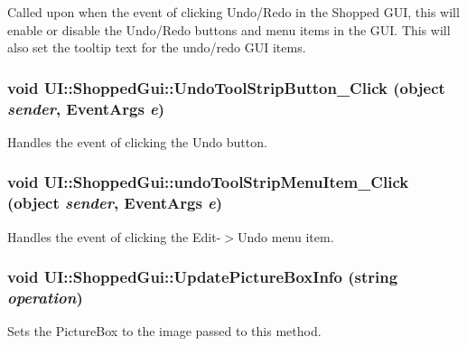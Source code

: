 \label{class_u_i_1_1_shopped_gui_a99e47a8b843bf190a7a0e3f8b3f5abb9}
Called upon when the event of clicking Undo/Redo in the Shopped GUI, this will enable or disable the Undo/Redo buttons and menu items in the GUI. This will also set the tooltip text for the undo/redo GUI items. \hypertarget{class_u_i_1_1_shopped_gui_a78f013b1629cf758caec6e07e8694988}{
\subsubsection[{UndoToolStripButton\_\-Click}]{\setlength{\rightskip}{0pt plus 5cm}void UI::ShoppedGui::UndoToolStripButton\_\-Click (object {\em sender}, \/  EventArgs {\em e})}}
\label{class_u_i_1_1_shopped_gui_a78f013b1629cf758caec6e07e8694988}
Handles the event of clicking the Undo button. \hypertarget{class_u_i_1_1_shopped_gui_a167624483eae61dcbe7de755ad0549a5}{
\subsubsection[{undoToolStripMenuItem\_\-Click}]{\setlength{\rightskip}{0pt plus 5cm}void UI::ShoppedGui::undoToolStripMenuItem\_\-Click (object {\em sender}, \/  EventArgs {\em e})}}
\label{class_u_i_1_1_shopped_gui_a167624483eae61dcbe7de755ad0549a5}
Handles the event of clicking the Edit-\/$>$Undo menu item. \hypertarget{class_u_i_1_1_shopped_gui_a74a1accbbc8cb69ea61830d9bfcd302c}{
\subsubsection[{UpdatePictureBoxInfo}]{\setlength{\rightskip}{0pt plus 5cm}void UI::ShoppedGui::UpdatePictureBoxInfo (string {\em operation})}}
\label{class_u_i_1_1_shopped_gui_a74a1accbbc8cb69ea61830d9bfcd302c}
Sets the PictureBox to the image passed to this method.


